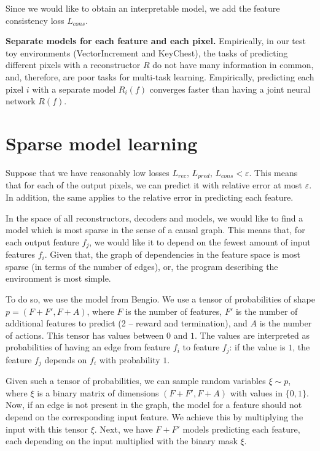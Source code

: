 \documentclass[a4paper,11pt,oneside]{report}
\begin{document}
Since we would like to obtain an interpretable model, we add the feature consistency loss $L_{cons}$.

{\bf Separate models for each feature and each pixel.} Empirically, in our test toy environments (VectorIncrement and KeyChest), the tasks of predicting different pixels with a reconstructor $R$ do not have many information in common, and, therefore, are poor tasks for multi-task learning. Empirically, predicting each pixel $i$ with a separate model $R_i(f)$ converges faster than having a joint neural network $R(f)$.

\section{Sparse model learning}
Suppose that we have reasonably low losses $L_{rec},\,L_{pred},\,L_{cons}<\varepsilon$. This means that for each of the output pixels, we can predict it with relative error at most $\varepsilon$. In addition, the same applies to the relative error in predicting each feature.

In the space of all reconstructors, decoders and models, we would like to find a model which is most sparse in the sense of a causal graph. This means that, for each output feature $f_j$, we would like it to depend on the fewest amount of input features $f_i$. Given that, the graph of dependencies in the feature space is most sparse (in terms of the number of edges), or, the program describing the environment is most simple.

To do so, we use the model from Bengio. We use a tensor of probabilities of shape $p=(F+F', F+A)$, where $F$ is the number of features, $F'$ is the number of additional features to predict (2 -- reward and termination), and $A$ is the number of actions. This tensor has values between $0$ and $1$. The values are interpreted as probabilities of having an edge from feature $f_i$ to feature $f_j$: if the value is $1$, the feature $f_j$ depends on $f_i$ with probability $1$.

Given such a tensor of probabilities, we can sample random variables $\xi\sim p$, where $\xi$ is a binary matrix of dimensions $(F+F', F+A)$ with values in $\{0, 1\}$. Now, if an edge is not present in the graph, the model for a feature should not depend on the corresponding input feature. We achieve this by multiplying the input with this tensor $\xi$. Next, we have $F+F'$ models predicting each feature, each depending on the input multiplied with the binary mask $\xi$.
\end{document}
